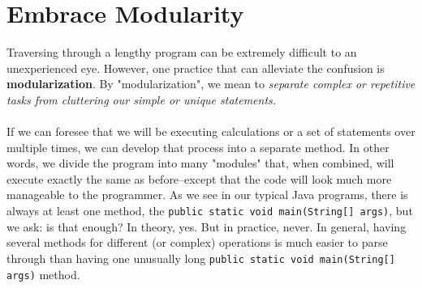 \documentclass[11pt,oneside]{article}
\newenvironment{articleSection}[1]
{\begin{list}{}
         {\setlength{\leftmargin}{1cm}}
         \item[]
}
{\end{list}}
\begin{document}
\section{Embrace Modularity}
\begin{articleSection}{0.5cm}
Traversing through a lengthy program can be extremely difficult to an unexperienced eye. However, one practice that can alleviate the confusion is {\bf modularization}. By "modularization", we mean to \emph{separate complex or repetitive tasks from cluttering our simple or unique statements.}\\
\\
If we can foresee that we will be executing calculations or a set of statements over multiple times, we can develop that process into a separate method. In other words, we divide the program into many "modules" that, when combined, will execute exactly the same as before--except that the code will look much more manageable to the programmer. As we see in our typical Java programs, there is always at least one method, the \lstinline{public static void main(String[] args)}, but we ask: is that enough? In theory, yes. But in practice, never. In general, having several methods for different (or complex) operations is much easier to parse through than having one unusually long \lstinline{public static void main(String[] args)} method.
\end{articleSection}
\end{document}
